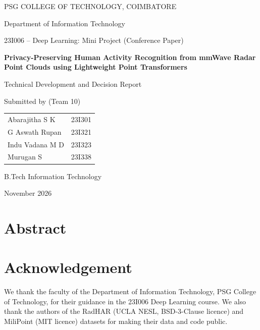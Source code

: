 \documentclass[12pt,a4paper,oneside]{report}
\begin{document}
\begin{titlepage}
\centering
{\large PSG COLLEGE OF TECHNOLOGY, COIMBATORE\par}
{\normalsize Department of Information Technology\par}
\vspace{1.2cm}
{\normalsize 23I006 -- Deep Learning: Mini Project (Conference Paper)\par}
\vspace{1.6cm}
{\fontsize{18}{24}\selectfont\bfseries Privacy-Preserving Human Activity Recognition from mmWave Radar Point Clouds using Lightweight Point Transformers\par}
\vspace{1.0cm}
{\fontsize{14}{18}\selectfont Technical Development and Decision Report\par}
\vspace{1.6cm}
{\normalsize Submitted by (Team 10)\par}
\vspace{0.3cm}
\begin{tabular}{ll}
Abarajitha S K & 23I301 \\
G Aswath Rupan & 23I321 \\
Indu Vadana M D & 23I323 \\
Murugan S & 23I338 \\
\end{tabular}
\vfill
{\normalsize B.Tech Information Technology\par}
{\normalsize November 2026\par}
\end{titlepage}

\chapter*{Abstract}


\chapter*{Acknowledgement}
We thank the faculty of the Department of Information Technology, PSG College of
Technology, for their guidance in the 23I006 Deep Learning course. We also thank the
authors of the RadHAR (UCLA NESL, BSD-3-Clause licence) and MiliPoint (MIT licence)
datasets for making their data and code public.

\tableofcontents
\listoffigures
\listoftables
\end{document}
